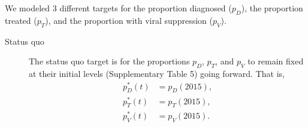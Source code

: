 \documentclass{article}
\begin{document}
We modeled 3 different targets for the proportion diagnosed ($p_D$), the
proportion treated ($p_T$), and the proportion with viral suppression ($p_V$).
\begin{description}
\item[Status quo] The status quo target is for the proportions $p_D$,
  $p_T$, and $p_V$ to remain fixed at their initial levels
  (Supplementary Table 5) going forward. That is,
  \begin{equation}
    \label{status_quo_target}
    \begin{split}
      p_D^*(t) &= p_D(2015), \\
      p_T^*(t) &= p_T(2015), \\
      p_V^*(t) &= p_V(2015).
    \end{split}
  \end{equation}


\end{description}
\end{document}
